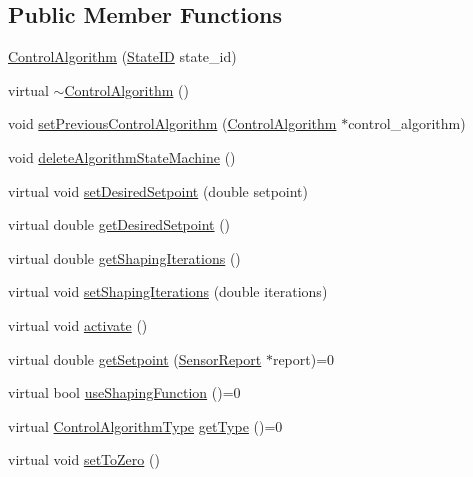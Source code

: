 \subsection*{Public Member Functions}
\begin{DoxyCompactItemize}
\item 
\hyperlink{classControlAlgorithm_a91089205780f22d25043b8d01b64323a}{Control\+Algorithm} (\hyperlink{States_8hpp_a26aafbeccd8f356b39e1809f1ab9cfdc}{State\+ID} state\+\_\+id)
\item 
virtual \hyperlink{classControlAlgorithm_a2c0a0a5a73afcbbdfdb1f1fc3c9408fd}{$\sim$\+Control\+Algorithm} ()
\item 
void \hyperlink{classControlAlgorithm_a6b0718c1b8eb993e2d97418e2758adb9}{set\+Previous\+Control\+Algorithm} (\hyperlink{classControlAlgorithm}{Control\+Algorithm} $\ast$control\+\_\+algorithm)
\item 
void \hyperlink{classControlAlgorithm_a81403fa6713bb56859df497503a6a09f}{delete\+Algorithm\+State\+Machine} ()
\item 
virtual void \hyperlink{classControlAlgorithm_ae94b3eefb4b06213e27ef61ee3e9876b}{set\+Desired\+Setpoint} (double setpoint)
\item 
virtual double \hyperlink{classControlAlgorithm_ac9b448583431a037bc8636872ee9bfb3}{get\+Desired\+Setpoint} ()
\item 
virtual double \hyperlink{classControlAlgorithm_a5fd58cfd5b601dc4556170bb620ea7f5}{get\+Shaping\+Iterations} ()
\item 
virtual void \hyperlink{classControlAlgorithm_afb67f383de5f6e85c7a7b8e711953c0e}{set\+Shaping\+Iterations} (double iterations)
\item 
virtual void \hyperlink{classControlAlgorithm_a0da6d49c48afb6df7c1bc4bad4e5a3f0}{activate} ()
\item 
virtual double \hyperlink{classControlAlgorithm_a038ebc5f26c3ae460f04eaf7f0dc0e29}{get\+Setpoint} (\hyperlink{classSensorReport}{Sensor\+Report} $\ast$report)=0
\item 
virtual bool \hyperlink{classControlAlgorithm_ac9e2b1e3677e4ace7071c540fe035ae4}{use\+Shaping\+Function} ()=0
\item 
virtual \hyperlink{Control__Algorithms_8hpp_afda28772870dd56f60cd7a301337392c}{Control\+Algorithm\+Type} \hyperlink{classControlAlgorithm_a432f51282dfe836befccdecaaa9741c5}{get\+Type} ()=0
\item 
virtual void \hyperlink{classControlAlgorithm_a154061241e21f6f7feb7165eda91bf15}{set\+To\+Zero} ()
\item 

\end{DoxyCompactItemize}
